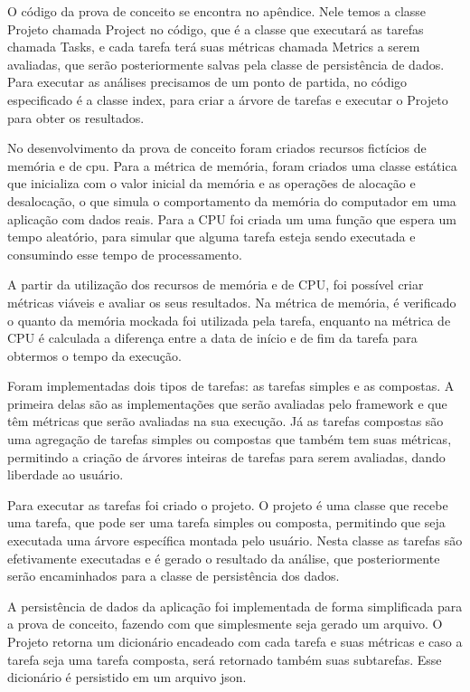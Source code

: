 \documentclass[12pt]{tcc}
\begin{document}
O código da prova de conceito se encontra no apêndice. Nele temos a classe Projeto chamada Project no código, que é a classe que executará as tarefas chamada Tasks, e cada tarefa terá suas métricas chamada Metrics a serem avaliadas, que serão posteriormente salvas pela classe de persistência de dados. Para executar as análises precisamos de um ponto de partida, no código especificado é a classe index, para criar a árvore de tarefas e executar o Projeto para obter os resultados.

No desenvolvimento da prova de conceito foram criados recursos fictícios de memória e de cpu. Para a métrica de memória, foram criados uma classe estática que inicializa com o valor inicial da memória e as operações de alocação e desalocação, o que simula o comportamento da memória do computador em uma aplicação com dados reais. Para a CPU foi criada um uma função que espera um tempo aleatório, para simular que alguma tarefa esteja sendo executada e consumindo esse tempo de processamento.

A partir da utilização dos recursos de memória e de CPU, foi possível criar métricas viáveis e avaliar os seus resultados. Na métrica de memória, é verificado o quanto da memória mockada foi utilizada pela tarefa, enquanto na métrica de CPU é calculada a diferença entre a data de início e de fim da tarefa para obtermos o tempo da execução. 

Foram implementadas dois tipos de tarefas: as tarefas simples e as compostas. A primeira delas são as implementações que serão avaliadas pelo framework e que têm métricas que serão avaliadas na sua execução. Já as tarefas compostas são uma agregação de tarefas simples ou compostas que também tem suas métricas, permitindo a criação de árvores inteiras de tarefas para serem avaliadas, dando liberdade ao usuário.

Para executar as tarefas foi criado o projeto. O projeto é uma classe que recebe uma tarefa, que pode ser uma tarefa simples ou composta, permitindo que seja executada uma árvore específica montada pelo usuário. Nesta classe as tarefas são efetivamente executadas e é gerado o resultado da análise, que posteriormente serão encaminhados para a classe de persistência dos dados.

A persistência de dados da aplicação foi implementada de forma simplificada para a prova de conceito, fazendo com que simplesmente seja gerado um arquivo. O Projeto retorna um dicionário encadeado com cada tarefa e suas métricas e caso a tarefa seja uma tarefa composta, será retornado também suas subtarefas. Esse dicionário é persistido em um arquivo json. 
\end{document}
